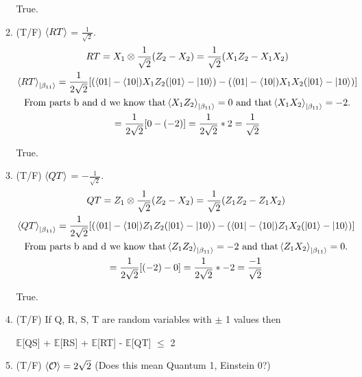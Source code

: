 \documentclass[]{article}
\begin{document}
\begin{enumerate}
\begin{enumerate}
          True.
        \item (T/F) $\braket{RT}$ = $\frac{1}{\sqrt{2}}$.
          \begin{gather*}
            RT = X_1 \otimes \frac{1}{\sqrt{2}}(Z_2 - X_2) = \frac{1}{\sqrt{2}}(X_1 Z_2 - X_1 X_2)\\
            \braket{RT}_{\ket{\beta_{11}}}
            = \frac{1}{2\sqrt{2}}[(\bra{01} - \bra{10})X_1 Z_2(\ket{01}-\ket{10})
            - (\bra{01} - \bra{10})X_1 X_2(\ket{01}-\ket{10})]\\
            \text{From parts b and d we know that} \braket{X_1Z_2}_{\ket{\beta_{11}}} = 0 
            \text{ and that} \braket{X_1X_2}_{\ket{\beta_{11}}} = -2 \text{.}\\
            = \frac{1}{2\sqrt{2}}[0 - (-2)] = \frac{1}{2\sqrt{2}} * 2 = \frac{1}{\sqrt{2}} 
          \end{gather*}

          True.
        \item (T/F) $\braket{QT}$ = $-\frac{1}{\sqrt{2}}$.
          \begin{gather*}
            QT = Z_1 \otimes \frac{1}{\sqrt{2}}(Z_2 - X_2) = \frac{1}{\sqrt{2}}(Z_1 Z_2 - Z_1 X_2)\\
            \braket{QT}_{\ket{\beta_{11}}}
            = \frac{1}{2\sqrt{2}}[(\bra{01} - \bra{10})Z_1 Z_2(\ket{01}-\ket{10})
            - (\bra{01} - \bra{10})Z_1 X_2(\ket{01}-\ket{10})]\\
            \text{From parts b and d we know that} \braket{Z_1Z_2}_{\ket{\beta_{11}}} = -2 
            \text{ and that} \braket{Z_1X_2}_{\ket{\beta_{11}}} = 0 \text{.}\\
            = \frac{1}{2\sqrt{2}}[(-2) - 0] = \frac{1}{2\sqrt{2}} * -2 = \frac{-1}{\sqrt{2}} 
          \end{gather*}

          True.
        \item (T/F) If Q, R, S, T are random variables with $\pm$ 1 values then 

          $\mathbb{E}$[QS] + $\mathbb{E}$[RS] + $\mathbb{E}$[RT] - $\mathbb{E}$[QT] $\le$ 2

        \item (T/F) $\braket{\mathcal O} = 2\sqrt{2}$ (Does this mean Quantum 1, Einstein 0?)
      \end{enumerate}
    \end{enumerate}
\end{document}
